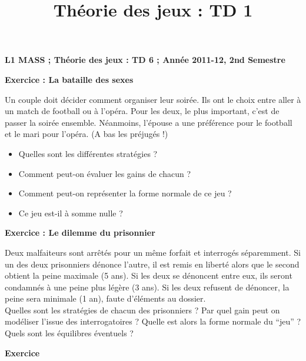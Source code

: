 \documentclass[12pt]{article}
\title{Th\'eorie des jeux : TD 1}
\date{}
\begin{document}
\pagestyle{empty}

\textbf{L1 MASS ;   Th\'eorie des jeux : TD 6    ;      Ann\'ee 2011-12, 2nd Semestre}
\medskip
\medskip
\medskip

\begin{center}
\textbf{Exercice : La bataille des sexes}\\
\end{center}

Un couple doit d\'ecider comment organiser leur soir\'ee. Ils ont le choix entre aller \`a un match de football ou \`a l'op\'era. 
Pour les deux, le plus important, c'est de passer la soir\'ee ensemble. 
N\'eanmoins, l'\'epouse a une pr\'ef\'erence pour le football et le mari pour l'op\'era. (A bas les pr\'ejug\'es !)

\begin{itemize}
\item Quelles sont les diff\'erentes strat\'egies ? 
\item Comment peut-on \'evaluer les gains de chacun ? 
\item Comment peut-on repr\'esenter la forme normale de ce jeu ? 
\item Ce jeu est-il \`a somme nulle ?
\end{itemize}


\begin{center}
\textbf{Exercice : Le dilemme du prisonnier}
\end{center}

Deux malfaiteurs sont arr\^et\'es pour un m\^eme forfait et interrog\'es s\'eparemment. Si un des deux prisonniers dénonce l'autre, 
il est remis en liberté alors que le second obtient la peine maximale (5 ans). Si les deux se dénoncent entre eux, ils seront condamnés à une peine plus légère (3 ans).
Si les deux refusent de dénoncer, la peine sera minimale (1 an), faute d'éléments au dossier.\\
Quelles sont les strat\'egies de chacun des prisonniers ? Par quel gain peut on mod\'eliser l’issue des interrogatoires ? 
Quelle est alors la forme normale du ``jeu'' ? Quels sont les  \'equilibres  \'eventuels ?
                                                                


\begin{center}
\textbf{Exercice}
\end{center}
\end{document}
